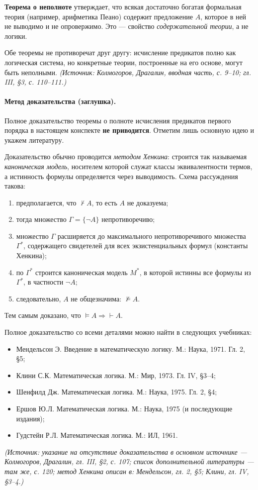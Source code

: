 \documentclass[a4paper,12pt]{article}
\begin{document}
\textbf{Теорема о неполноте} утверждает, что всякая достаточно богатая формальная теория (например, арифметика Пеано) содержит предложение \(A\), которое в ней не выводимо и не опровержимо. Это --- свойство \emph{содержательной теории}, а не логики.

Обе теоремы не противоречат друг другу: исчисление предикатов полно как логическая система, но конкретные теории, построенные на его основе, могут быть неполными.
\textit{(Источник: Колмогоров, Драгалин, вводная часть, с. 9--10; гл. III, §3, с. 110--111.)}

\paragraph{Метод доказательства (заглушка).} Полное доказательство теоремы о полноте исчисления предикатов первого порядка в настоящем конспекте \textbf{не приводится}. Отметим лишь основную идею и укажем литературу.

Доказательство обычно проводится \emph{методом Хенкина}: строится так называемая \emph{каноническая модель}, носителем которой служат классы эквивалентности термов, а истинность формулы определяется через выводимость. Схема рассуждения такова:
\begin{enumerate}[label=\arabic*)]
\item предполагается, что \(\not\vdash A\), то есть \(A\) не доказуема;
\item тогда множество \(\Gamma=\{\neg A\}\) непротиворечиво;
\item множество \(\Gamma\) расширяется до максимального непротиворечивого множества \(\Gamma^*\), содержащего свидетелей для всех экзистенциальных формул (константы Хенкина);
\item по \(\Gamma^*\) строится каноническая модель \(M^*\), в которой истинны все формулы из \(\Gamma^*\), в частности \(\neg A\);
\item следовательно, \(A\) не общезначима: \(\not\models A\).
\end{enumerate}
Тем самым доказано, что \(\models A\Rightarrow\vdash A\).

Полное доказательство со всеми деталями можно найти в следующих учебниках:
\begin{itemize}
\item Мендельсон Э. Введение в математическую логику. М.: Наука, 1971. Гл. 2, §5;
\item Клини С.К. Математическая логика. М.: Мир, 1973. Гл. IV, §3--4;
\item Шенфилд Дж. Математическая логика. М.: Наука, 1975. Гл. 2, §4;
\item Ершов Ю.Л. Математическая логика. М.: Наука, 1975 (и последующие издания);
\item Гудстейн Р.Л. Математическая логика. М.: ИЛ, 1961.
\end{itemize}
\textit{(Источник: указание на отсутствие доказательства в основном источнике --- Колмогоров, Драгалин, гл. III, §2, с. 107; список дополнительной литературы --- там же, с. 120; метод Хенкина описан в: Мендельсон, гл. 2, §5; Клини, гл. IV, §3--4.)}
\end{document}
